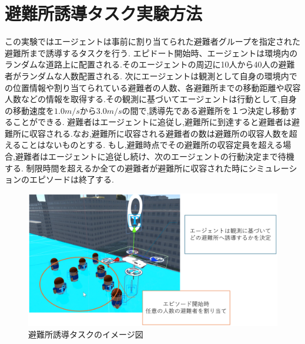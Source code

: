 \section{避難所誘導タスク実験方法}
この実験ではエージェントは事前に割り当てられた避難者グループを指定された避難所まで誘導するタスクを行う.
エピドート開始時、エージェントは環境内のランダムな道路上に配置される.そのエージェントの周辺に10人から40人の避難者がランダムな人数配置される.
次にエージェントは観測として自身の環境内での位置情報や割り当てられている避難者の人数、各避難所までの移動距離や収容人数などの情報を取得する.その観測に基づいてエージェントは行動として,自身の移動速度を$1.0m/s$から$3.0m/s$の間で,誘導先である避難所を１つ決定し移動することができる.
避難者はエージェントに追従し,避難所に到達すると避難者は避難所に収容される.なお,避難所に収容される避難者の数は避難所の収容人数を超えることはないものとする.
もし,避難時点でその避難所の収容定員を超える場合,避難者はエージェントに追従し続け、次のエージェントの行動決定まで待機する.
制限時間を超えるか全ての避難者が避難所に収容された時にシミュレーションのエピソードは終了する.
\begin{figure}[H] 
  \centering 
  \includegraphics[width=1.0\textwidth]{Figures/GuidTaskEx.png}
  \caption{避難所誘導タスクのイメージ図}
  \label{fig:01} 
\end{figure}
